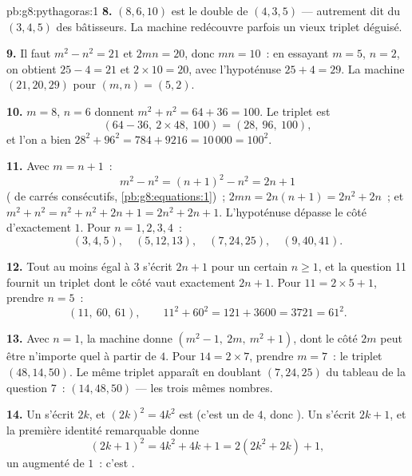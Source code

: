 \begin{solution}{pb:g8:pythagoras:1}
\textbf{8.} $(8, 6, 10)$ est le double de $(4, 3, 5)$ --- autrement
dit du $(3, 4, 5)$ des bâtisseurs. La machine redécouvre parfois un
vieux triplet déguisé.

\textbf{9.} Il faut $m^2 - n^2 = 21$ et $2mn = 20$, donc
$mn = 10$~: en essayant $m = 5$, $n = 2$, on obtient
$25 - 4 = 21$ et $2 \times 10 = 20$, avec l'hypoténuse
$25 + 4 = 29$. La machine  $(21, 20, 29)$ pour
$(m, n) = (5, 2)$.

\textbf{10.} $m = 8$, $n = 6$ donnent $m^2 + n^2 = 64 + 36 = 100$.
Le triplet est
\[
\left(64 - 36,\ 2 \times 48,\ 100\right) = (28,\ 96,\ 100),
\]
et l'on a bien $28^2 + 96^2 = 784 + 9216 = 10\,000 = 100^2$.

\textbf{11.} Avec $m = n + 1$~:
\[
m^2 - n^2 = (n + 1)^2 - n^2 = 2n + 1
\]
( de carrés consécutifs, \cref{pb:g8:equations:1})~;
$2mn = 2n(n + 1) = 2n^2 + 2n$~; et
$m^2 + n^2 = n^2 + n^2 + 2n + 1 = 2n^2 + 2n + 1$. L'hypoténuse
dépasse le côté  d'exactement $1$. Pour $n = 1, 2, 3, 4$~:
\[
(3, 4, 5), \quad (5, 12, 13), \quad (7, 24, 25), \quad
(9, 40, 41) .
\]

\textbf{12.} Tout  au moins égal à $3$ s'écrit
$2n + 1$ pour un certain $n \geq 1$, et la question 11 fournit un
triplet dont le côté  vaut exactement $2n + 1$. Pour
$11 = 2 \times 5 + 1$, prendre $n = 5$~:
\[
(11,\ 60,\ 61),
\qquad
11^2 + 60^2 = 121 + 3600 = 3721 = 61^2 .
\]

\textbf{13.} Avec $n = 1$, la machine donne
$\left(m^2 - 1,\ 2m,\ m^2 + 1\right)$, dont le côté  $2m$ peut
être n'importe quel  à partir de $4$. Pour
$14 = 2 \times 7$, prendre $m = 7$~: le triplet $(48, 14, 50)$. Le
même triplet apparaît en doublant $(7, 24, 25)$ du tableau de la
question 7~: $(14, 48, 50)$ --- les trois mêmes nombres.

\textbf{14.} Un  s'écrit $2k$, et $(2k)^2 = 4k^2$ est
 (c'est un  de $4$, donc ). Un 
s'écrit $2k + 1$, et la première identité remarquable donne
\[
(2k + 1)^2 = 4k^2 + 4k + 1 = 2\left(2k^2 + 2k\right) + 1 ,
\]
un  augmenté de $1$~: c'est .


\end{solution}
